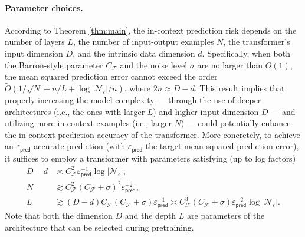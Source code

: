 \documentclass[english]{article}
\begin{document}
    \paragraph{Parameter choices.} According to Theorem \ref{thm:main}, the in-context prediction risk depends on the number of layers $L$, the number of input-output examples $N$,  the transformer's input dimension $D$, and the  intrinsic data dimension $d$. Specifically, when both the Barron-style parameter $C_{\mathcal{F}}$ and the noise level $\sigma$ are no larger than $O(1)$, the mean squared prediction error cannot exceed the order $\widetilde{O}(1/\sqrt{N} + n/L+ \log|\mathcal{N}_\varepsilon|/n)$, where $2n \approx D-d$.
    This result implies that properly increasing the model complexity --- through the use of deeper architectures (i.e., the ones with larger $L$) and  higher input dimension $D$ --- and utilizing more in-context examples (i.e., larger $N$) --- could potentially enhance the in-context prediction accuracy of the transformer. More concretely, to achieve an $\varepsilon_{\mathsf{pred}}$-accurate prediction (with $\varepsilon_{\mathsf{pred}}$ the target mean squared prediction error), it suffices to employ a transformer with parameters satisfying (up to log factors)
    \begin{subequations}
    \label{eq:param-choice-construction}
    \begin{align}
    D-d&\asymp C_{\mathcal{F}}^2\varepsilon_{\mathsf{pred}}^{-1}\log|\mathcal{N}_\varepsilon|, \\
    N&\gtrsim C_{\mathcal{F}}^2(C_{\mathcal{F}}+\sigma)^2\varepsilon^{-2}_{\mathsf{pred}}, \\
    L&\gtrsim (D-d) C_{\mathcal{F}}(C_{\mathcal{F}}+\sigma)\varepsilon^{-1}_{\mathsf{pred}}\asymp C_{\mathcal{F}}^3(C_{\mathcal{F}}+\sigma)\varepsilon_{\mathsf{pred}}^{-2}\log|\mathcal{N}_\varepsilon|.
    \end{align}
    \end{subequations}
%
 Note that both the dimension $D$ and the depth $L$ are parameters of the architecture that can be selected during pretraining. 
\end{document}
